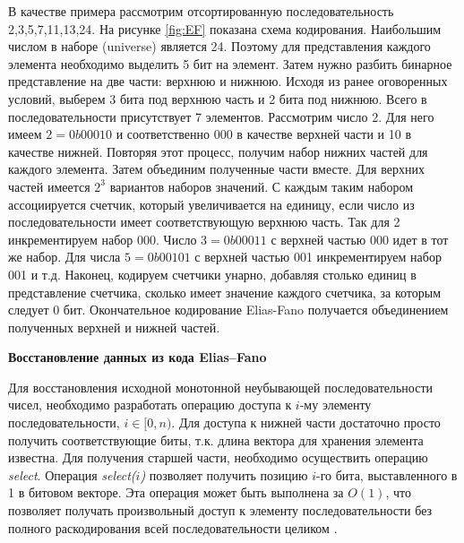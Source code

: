 В качестве примера рассмотрим отсортированную последовательность {2,3,5,7,11,13,24}.
На рисунке \ref{fig:EF} показана схема кодирования. Наибольшим числом в наборе (universe) является 24.
Поэтому для представления каждого элемента необходимо выделить 5 бит на элемент.
Затем нужно разбить бинарное представление на две части: верхнюю и нижнюю.
Исходя из ранее оговоренных условий, выберем 3 бита под верхнюю часть и 2 бита под нижнюю.
Всего в последовательности присутствует 7 элементов. Рассмотрим число 2. Для него имеем
$2 = 0b00010$ и соответственно 000 в качестве верхней части и 10 в качестве нижней.
Повторяя этот процесс, получим набор нижних частей для каждого элемента.
Затем объединим полученные части вместе. Для верхних частей имеется $2^3$ вариантов
наборов значений. С каждым таким набором ассоциируется счетчик, который увеличивается на единицу,
если число из последовательности имеет соответствующую верхнюю часть.
Так для 2 инкрементируем набор 000. Число $3 = 0b00011$ с верхней частью 000 идет в тот же набор.
Для числа $5 = 0b00101$ с верхней частью 001 инкрементируем набор 001 и т.д.
Наконец, кодируем счетчики унарно, добавляя столько единиц в представление счетчика,
сколько имеет значение каждого счетчика, за которым следует 0 бит.
Окончательное кодирование Elias-Fano получается объединением полученных верхней и нижней частей.

\textbf{Восстановление данных из кода Elias--Fano}

Для восстановления исходной монотонной неубывающей последовательности чисел, необходимо разработать операцию
доступа к $i$-му элементу последовательности, $i \in [0, n)$. Для доступа к нижней части
достаточно просто получить соответствующие биты, т.к. длина вектора для хранения элемента известна.
Для получения старшей части, необходимо осуществить операцию \emph{select}.
Операция \emph{select($i$)} позволяет получить позицию $i$-го бита, выставленного в 1 в битовом векторе.
Эта операция может быть выполнена за $O(1)$, что позволяет получать произвольный доступ к элементу
последовательности без полного раскодирования всей последовательности целиком \cite{farina2009rank}.